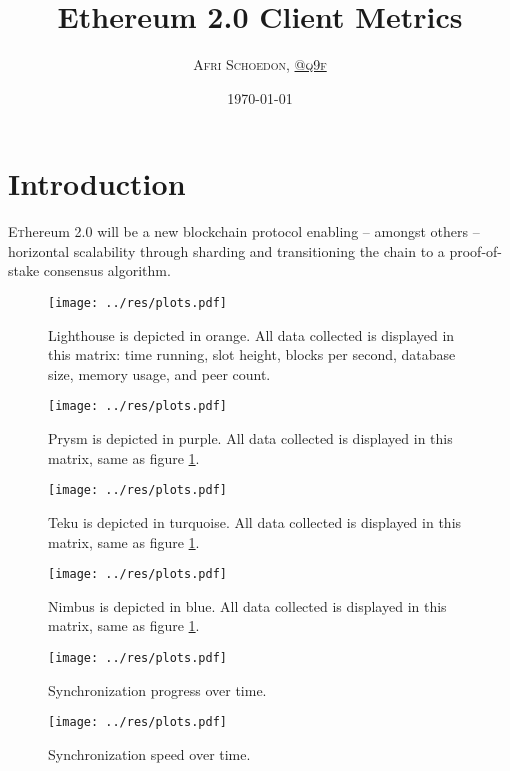 \documentclass[twoside,twocolumn]{article}
\title{Ethereum 2.0 Client Metrics}
\author{\textsc{Afri Schoedon, \href{https://github.com/q9f}{@q9f}}}\date{\today}
\begin{document}
\maketitle
\section{Introduction}
\lettrine[nindent=0em,lines=3]{E}thereum 2.0 will be a new blockchain protocol enabling -- amongst others -- horizontal scalability through sharding and transitioning the chain to a proof-of-stake consensus algorithm.\par

\begin{figure}[t]
	\centering
	\texttt{[image: ../res/plots.pdf]}
	\caption{Lighthouse is depicted in orange. All data collected is displayed in this matrix: time running, slot height, blocks per second, database size, memory usage, and peer count.}
	\label{img:lh}
\end{figure}

\begin{figure}[t]
	\centering
	\texttt{[image: ../res/plots.pdf]}
	\caption{Prysm is depicted in purple. All data collected is displayed in this matrix, same as figure \ref{img:lh}.}
	\label{img:pr}
\end{figure}

\begin{figure}[t]
	\centering
	\texttt{[image: ../res/plots.pdf]}
	\caption{Teku is depicted in turquoise. All data collected is displayed in this matrix, same as figure \ref{img:lh}.}
	\label{img:tk}
\end{figure}

\begin{figure}[t]
	\centering
	\texttt{[image: ../res/plots.pdf]}
	\caption{Nimbus is depicted in blue. All data collected is displayed in this matrix, same as figure \ref{img:lh}.}
	\label{img:nb}
\end{figure}

\begin{figure}[t]
	\centering
	\texttt{[image: ../res/plots.pdf]}
	\caption{Synchronization progress over time.}
	\label{img:sync:prog}
\end{figure}

\begin{figure}[t]
	\centering
	\texttt{[image: ../res/plots.pdf]}
	\caption{Synchronization speed over time.}
	\label{img:sync:sped}
\end{figure}
\end{document}
